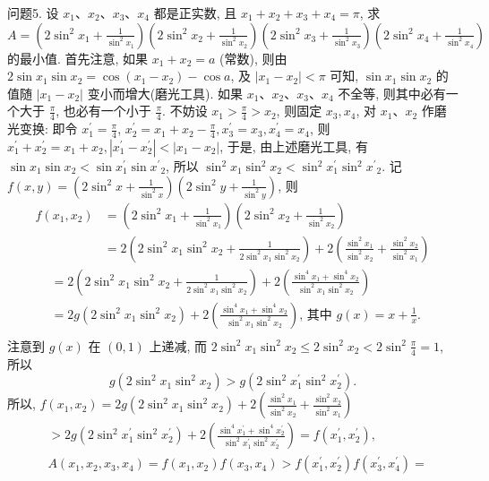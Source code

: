 问题5. 设 $x_1 、 x_2 、 x_3 、 x_4$ 都是正实数, 且 $x_1+x_2+x_3+x_4=\pi$, 求$A=\left(2 \sin ^2 x_1+\frac{1}{\sin ^2 x_1}\right)\left(2 \sin ^2 x_2+\frac{1}{\sin ^2 x_2}\right)\left(2 \sin ^2 x_3+\frac{1}{\sin ^2 x_3}\right)\left(2 \sin ^2 x_4+\frac{1}{\sin ^2 x_4}\right)$ 的最小值.
首先注意, 如果 $x_1+x_2=a$ (常数), 则由 $2 \sin x_1 \sin x_2=\cos \left(x_1-x_2\right)- \cos a$, 及 $\left|x_1-x_2\right|<\pi$ 可知, $\sin x_1 \sin x_2$ 的值随 $\left|x_1-x_2\right|$ 变小而增大(磨光工具).
如果 $x_1 、 x_2 、 x_3 、 x_4$ 不全等, 则其中必有一个大于 $\frac{\pi}{4}$, 也必有一个小于 $\frac{\pi}{4}$.
不妨设 $x_1>\frac{\pi}{4}>x_2$, 则固定 $x_3, x_4$, 对 $x_1 、 x_2$ 作磨光变换: 即令 $x_1^{\prime}=\frac{\pi}{4}$, $x_2^{\prime}=x_1+x_2-\frac{\pi}{4}, x_3^{\prime}=x_3, x_4^{\prime}=x_4$, 则 $x_1^{\prime}+x_2^{\prime}=x_1+x_2,\left|x_1^{\prime}-x_2^{\prime}\right|<\left|x_1-x_2\right|$, 于是, 由上述磨光工具, 有
$\sin x_1 \sin x_2<\sin x_1^{\prime} \sin x^{\prime}{ }_2$, 所以 $\sin ^2 x_1 \sin ^2 x_2<\sin ^2 x_1^{\prime} \sin ^2 x^{\prime}{ }_2$.
记 $f(x, y)=\left(2 \sin ^2 x+\frac{1}{\sin ^2 x}\right)\left(2 \sin ^2 y+\frac{1}{\sin ^2 y}\right)$, 则
$$
\begin{aligned}
f\left(x_1, x_2\right) & =\left(2 \sin ^2 x_1+\frac{1}{\sin ^2 x_1}\right)\left(2 \sin ^2 x_2+\frac{1}{\sin ^2 x_2}\right) \\
& =2\left(2 \sin ^2 x_1 \sin ^2 x_2+\frac{1}{2 \sin ^2 x_1 \sin ^2 x_2}\right)+2\left(\frac{\sin ^2 x_1}{\sin ^2 x_2}+\frac{\sin ^2 x_2}{\sin ^2 x_1}\right)
\end{aligned}
$$
$$
\begin{aligned}
& =2\left(2 \sin ^2 x_1 \sin ^2 x_2+\frac{1}{2 \sin ^2 x_1 \sin ^2 x_2}\right)+2\left(\frac{\sin ^4 x_1+\sin ^4 x_2}{\sin ^2 x_1 \sin ^2 x_2}\right) \\
& =2 g\left(2 \sin ^2 x_1 \sin ^2 x_2\right)+2\left(\frac{\sin ^4 x_1+\sin ^4 x_2}{\sin ^2 x_1 \sin ^2 x_2}\right) \text {, 其中 } g(x)=x+\frac{1}{x} \text {. } \\
&
\end{aligned}
$$
注意到 $g(x)$ 在 $(0,1)$ 上递减, 而 $2 \sin ^2 x_1 \sin ^2 x_2 \leqslant 2 \sin ^2 x_2<2 \sin ^2 \frac{\pi}{4}=1$, 所以
$$
g\left(2 \sin ^2 x_1 \sin ^2 x_2\right)>g\left(2 \sin ^2 x_1^{\prime} \sin ^2 x_2^{\prime}\right) .
$$
所以, $f\left(x_1, x_2\right)=2 g\left(2 \sin ^2 x_1 \sin ^2 x_2\right)+2\left(\frac{\sin ^2 x_1}{\sin ^2 x_2}+\frac{\sin ^2 x_2}{\sin ^2 x_1}\right)$
$$
\begin{aligned}
& >2 g\left(2 \sin ^2 x_1^{\prime} \sin ^2 x_2^{\prime}\right)+2\left(\frac{\sin ^4 x_1^{\prime}+\sin ^4 x_2^{\prime}}{\sin ^2 x_1^{\prime} \sin ^2 x_2^{\prime}}\right)=f\left(x_1^{\prime}, x_2^{\prime}\right), \\
& A\left(x_1, x_2, x_3, x_4\right)=f\left(x_1, x_2\right) f\left(x_3, x_4\right)>f\left(x_1^{\prime}, x_2^{\prime}\right) f\left(x_3^{\prime}, x_4^{\prime}\right)=
\end{aligned}
$$
